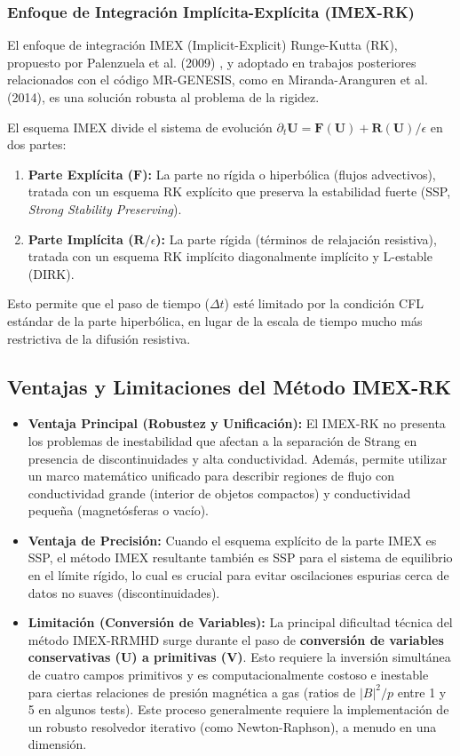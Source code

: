 \subsubsection{Enfoque de Integración Implícita-Explícita (IMEX-RK)}
El enfoque de integración IMEX (Implicit-Explicit) Runge-Kutta (RK), propuesto por Palenzuela et al. (2009) \cite{12, 384, 395}, y adoptado en trabajos posteriores relacionados con el código MR-GENESIS, como en Miranda-Aranguren et al. (2014), es una solución robusta al problema de la rigidez.

El esquema IMEX divide el sistema de evolución $\partial_t \mathbf{U} = \mathbf{F}(\mathbf{U}) + \mathbf{R}(\mathbf{U})/\epsilon$ en dos partes:
\begin{enumerate}
    \item \textbf{Parte Explícita ($\mathbf{F}$):} La parte no rígida o hiperbólica (flujos advectivos), tratada con un esquema RK explícito que preserva la estabilidad fuerte (SSP, \textit{Strong Stability Preserving}).
    \item \textbf{Parte Implícita ($\mathbf{R}/\epsilon$):} La parte rígida (términos de relajación resistiva), tratada con un esquema RK implícito diagonalmente implícito y L-estable (DIRK).
\end{enumerate}
Esto permite que el paso de tiempo ($\Delta t$) esté limitado por la condición CFL estándar de la parte hiperbólica, en lugar de la escala de tiempo mucho más restrictiva de la difusión resistiva.

\subsection{Ventajas y Limitaciones del Método IMEX-RK}

\begin{itemize}
    \item \textbf{Ventaja Principal (Robustez y Unificación):} El IMEX-RK no presenta los problemas de inestabilidad que afectan a la separación de Strang en presencia de discontinuidades y alta conductividad. Además, permite utilizar un marco matemático unificado para describir regiones de flujo con conductividad grande (interior de objetos compactos) y conductividad pequeña (magnetósferas o vacío).
    \item \textbf{Ventaja de Precisión:} Cuando el esquema explícito de la parte IMEX es SSP, el método IMEX resultante también es SSP para el sistema de equilibrio en el límite rígido, lo cual es crucial para evitar oscilaciones espurias cerca de datos no suaves (discontinuidades).
    \item \textbf{Limitación (Conversión de Variables):} La principal dificultad técnica del método IMEX-RRMHD surge durante el paso de \textbf{conversión de variables conservativas ($\mathbf{U}$) a primitivas ($\mathbf{V}$)}. Esto requiere la inversión simultánea de cuatro campos primitivos y es computacionalmente costoso e inestable para ciertas relaciones de presión magnética a gas (ratios de $|B|^2/p$ entre 1 y 5 en algunos tests). Este proceso generalmente requiere la implementación de un robusto resolvedor iterativo (como Newton-Raphson), a menudo en una dimensión.
\end{itemize}

